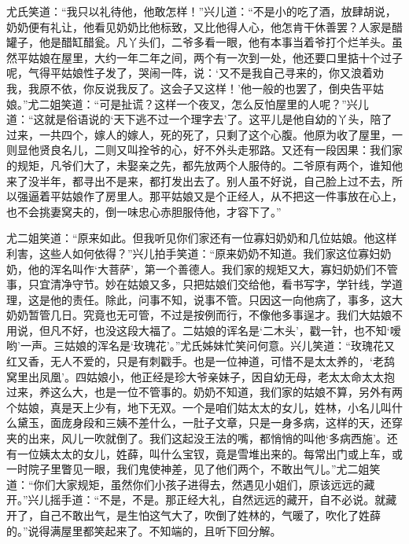 \documentclass[12pt,oneside]{book}
\begin{document}
尤氏笑道：“我只以礼待他，他敢怎样！”兴儿道：“不是小的吃了酒，放肆胡说，奶奶便有礼让，他看见奶奶比他标致，又比他得人心，他怎肯干休善罢？人家是醋罐子，他是醋缸醋瓮。凡丫头们，二爷多看一眼，他有本事当着爷打个烂羊头。虽然平姑娘在屋里，大约一年二年之间，两个有一次到一处，他还要口里掂十个过子呢，气得平姑娘性子发了，哭闹一阵，说：‘又不是我自己寻来的，你又浪着劝我，我原不依，你反说我反了。这会子又这样！’他一般的也罢了，倒央告平姑娘。”尤二姐笑道：“可是扯谎？这样一个夜叉，怎么反怕屋里的人呢？”兴儿道：“这就是俗语说的‘天下逃不过一个理字去’了。这平儿是他自幼的丫头，陪了过来，一共四个，嫁人的嫁人，死的死了，只剩了这个心腹。他原为收了屋里，一则显他贤良名儿，二则又叫拴爷的心，好不外头走邪路。又还有一段因果：我们家的规矩，凡爷们大了，未娶亲之先，都先放两个人服侍的。二爷原有两个，谁知他来了没半年，都寻出不是来，都打发出去了。别人虽不好说，自己脸上过不去，所以强逼着平姑娘作了房里人。那平姑娘又是个正经人，从不把这一件事放在心上，也不会挑妻窝夫的，倒一味忠心赤胆服侍他，才容下了。”

尤二姐笑道：“原来如此。但我听见你们家还有一位寡妇奶奶和几位姑娘。他这样利害，这些人如何依得？”兴儿拍手笑道：“原来奶奶不知道。我们家这位寡妇奶奶，他的浑名叫作‘大菩萨’，第一个善德人。我们家的规矩又大，寡妇奶奶们不管事，只宜清净守节。妙在姑娘又多，只把姑娘们交给他，看书写字，学针线，学道理，这是他的责任。除此，问事不知，说事不管。只因这一向他病了，事多，这大奶奶暂管几日。究竟也无可管，不过是按例而行，不像他多事逞才。我们大姑娘不用说，但凡不好，也没这段大福了。二姑娘的诨名是‘二木头’，戳一针，也不知‘嗳哟’一声。三姑娘的浑名是‘玫瑰花’。”尤氏姊妹忙笑问何意。兴儿笑道：“玫瑰花又红又香，无人不爱的，只是有刺戳手。也是一位神道，可惜不是太太养的，‘老鸹窝里出凤凰’。四姑娘小，他正经是珍大爷亲妹子，因自幼无母，老太太命太太抱过来，养这么大，也是一位不管事的。奶奶不知道，我们家的姑娘不算，另外有两个姑娘，真是天上少有，地下无双。一个是咱们姑太太的女儿，姓林，小名儿叫什么黛玉，面庞身段和三姨不差什么，一肚子文章，只是一身多病，这样的天，还穿夹的出来，风儿一吹就倒了。我们这起没王法的嘴，都悄悄的叫他‘多病西施’。还有一位姨太太的女儿，姓薛，叫什么宝钗，竟是雪堆出来的。每常出门或上车，或一时院子里瞥见一眼，我们鬼使神差，见了他们两个，不敢出气儿。”尤二姐笑道：“你们大家规矩，虽然你们小孩子进得去，然遇见小姐们，原该远远的藏开。”兴儿摇手道：“不是，不是。那正经大礼，自然远远的藏开，自不必说。就藏开了，自己不敢出气，是生怕这气大了，吹倒了姓林的，气暖了，吹化了姓薛的。”说得满屋里都笑起来了。不知端的，且听下回分解。
\end{document}
